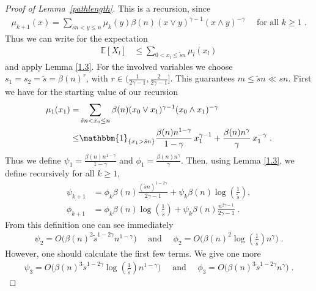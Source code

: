 \documentclass[12pt,a4paper]{article}
\numberwithin{equation}{section}
\begin{document}
\begin{proof}[Proof of Lemma~\ref{pathlength}]
	This is a recursion, since
\begin{align} \label{recurmu}
  \mu_{k+1}(x)=\sum_{\tilde sn<y\le n}\mu_k(y) \beta(n) (x \vee y)^{\gamma-1}(x \wedge y)^{-\gamma} \quad \text{ for all } k\ge1 \; .
\end{align}
Thus we can write for the expectation
\begin{align} \label{14}
		\mathbb{E}[X_l]&\le \sum_{0<x_l\le \tilde sn} \mu_l(x_l)
\end{align}
and apply Lemma \ref{1.3}. For the involved variables  we choose $s_1=s_2=\tilde s =\beta(n)^{r}$, with $r\in(\tfrac{1}{2\gamma-1},\tfrac{2}{2\gamma-1}]$. This guarantees $m\le \tilde s n \ll sn$.
 First we have for the starting value of our recursion
\begin{align*}
    \mu_1(x_1)= & \sum_{\tilde sn<x_{0}\le n} \beta(n)(x_0 \vee x_{1})^{\gamma-1}(x_0 \wedge x_{1})^{-\gamma}
		\\ \le & \mathbbm{1}_{\{x_1 >\tilde sn\}}\frac{\beta(n) n^{1-\gamma}}{1-\gamma}\, x_{1}^{\gamma-1}+\frac{\beta(n) n^{\gamma}}{\gamma}\, x_{1}^{-\gamma} \;.
\end{align*}
Thus we define $\psi_1=\tfrac{\beta(n) n^{1-\gamma}}{1-\gamma}$ and $\phi_1=\tfrac{\beta(n) n^{\gamma}}{\gamma}$. Then, using Lemma \ref{1.3}, we define recursively for all $k\ge1$,
\begin{equation}
    \label{psiphi}
\begin{aligned}
		\psi_{k+1}&=\phi_k  \beta(n)\frac{(\tilde s n)^{1-2\gamma}}{2\gamma-1}+\psi_k \beta(n) \log\left(\tfrac{1}{\tilde s}\right),
		\\ \phi_{k+1}&=\phi_k \beta(n) \log\left(\tfrac{1}{\tilde s}\right)+\psi_k \beta(n) \frac{n^{2 \gamma -1}}{2\gamma-1} \;.
\end{aligned}
\end{equation}
From this definition one can see immediately
\begin{align*}
    \psi_2 =O\Big(\beta(n)^{2}\tilde s ^{1-2\gamma} n^{1-\gamma}  \Big) \quad \text{ and } \quad
    \phi_2 =O\Big( \beta(n)^2  \log\left(\tfrac{1}{\tilde s}\right) n^{\gamma}  \Big) \;.
\end{align*}
However, one should calculate the first few terms. We give one more
\begin{align*}
    \psi_3 =O\Big(\beta(n)^{3}\tilde s ^{1-2\gamma}\log\left(\tfrac{1}{\tilde s}\right) n^{1-\gamma}  \Big) \quad \text{ and } \quad
    \phi_3 =O\Big( \beta(n)^{3}\tilde s ^{1-2\gamma}   n^{\gamma}  \Big)  \;.
\end{align*}

\end{proof}
\end{document}
